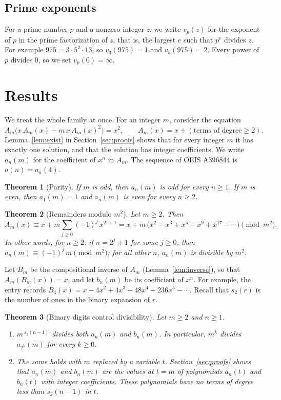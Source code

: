 \documentclass[11pt,a4paper]{article}
\newtheorem{theorem}{Theorem}[section]
\theoremstyle{definition}
\theoremstyle{remark}
\begin{document}
\subsection{Prime exponents}
For a prime number $p$ and a nonzero integer $z$, we write $v_p(z)$ for the exponent of $p$ in the prime factorization
of $z$, that is, the largest $e$ such that $p^e$ divides $z$. For example $975=3\cdot5^2\cdot13$, so $v_3(975)=1$ and
$v_5(975)=2$. Every power of $p$ divides $0$, so we set $v_p(0)=\infty$.


\section{Results}\label{sec:results}

We treat the whole family at once. For an integer $m$, consider the equation
\begin{equation}\label{eq:general}
A_m\bigl(x\,A_m(x)-m\,x\,A_m(x)^2\bigr)=x^2,\qquad A_m(x)=x+(\text{terms of degree}\ge2).
\end{equation}
Lemma~\ref{lem:exist} in Section~\ref{sec:proofs} shows that for every integer $m$ it has exactly one solution, and
that the solution has integer coefficients. We write $a_n(m)$ for the coefficient of $x^n$ in $A_m$. The sequence of
OEIS A396844 is $a(n)=a_n(4)$.

\begin{theorem}[Parity]\label{thm:parity}
If $m$ is odd, then $a_n(m)$ is odd for every $n\ge1$. If $m$ is even, then $a_1(m)=1$ and $a_n(m)$ is even for every
$n\ge2$.
\end{theorem}

\begin{theorem}[Remainders modulo $m^2$]\label{thm:modsq}
Let $m\ge2$. Then
\[
A_m(x)\equiv x+m\sum_{j\ge0}(-1)^j\,x^{2^j+1}=x+m\,\bigl(x^2-x^3+x^5-x^9+x^{17}-\cdots\bigr)\pmod{m^2}.
\]
In other words, for $n\ge2$: if $n=2^j+1$ for some $j\ge0$, then $a_n(m)\equiv(-1)^j\,m\pmod{m^2}$; for all other $n$,
$a_n(m)$ is divisible by $m^2$.
\end{theorem}

Let $B_m$ be the compositional inverse of $A_m$ (Lemma~\ref{lem:inverse}), so that $A_m(B_m(x))=x$, and let $b_n(m)$ be
its coefficient of $x^n$. For example, the entry records $B_{4}(x)=x-4x^2+4x^3-48x^4+236x^5-\cdots.$
Recall that $s_2(r)$ is the number of ones in the binary expansion of $r$.

\begin{theorem}[Binary digits control divisibility]\label{thm:binary}
Let $m\ge2$ and $n\ge1$.
\begin{enumerate}[label=(\alph*)]
\item $m^{\,s_2(n-1)}$ divides both $a_n(m)$ and $b_n(m)$. In particular, $m^k$ divides $a_{2^k}(m)$ for every $k\ge0$.
\item The same holds with $m$ replaced by a variable $t$. Section~\ref{sec:proofs} shows that $a_n(m)$ and $b_n(m)$ are
the values at $t=m$ of polynomials $a_n(t)$ and $b_n(t)$ with integer coefficients. These polynomials have no terms of
degree less than $s_2(n-1)$ in $t$.
\end{enumerate}
\end{theorem}
\end{document}

